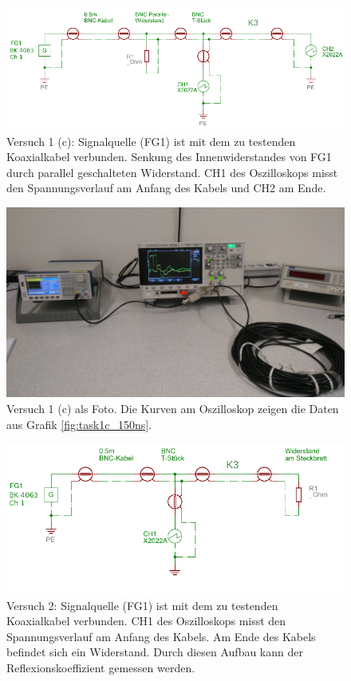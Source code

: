 \documentclass{article}
\begin{document}
\begin{figure}[H]
\centering
\caption{Versuch 1 (c): Signalquelle (FG1) ist mit dem zu testenden Koaxialkabel verbunden. Senkung des Innenwiderstandes von FG1 durch parallel geschalteten Widerstand. CH1 des Oszilloskops misst den Spannungsverlauf am Anfang des Kabels und CH2 am Ende.}
\label{fig:anordnung_task1c}
\includegraphics[scale=2]{task1c.png}
\end{figure}



\begin{figure}[H]
\centering
\caption{Versuch 1 (c) als Foto. Die Kurven am Oszilloskop zeigen die Daten aus Grafik \ref{fig:task1c_150ns}.}
\label{fig:foto_task1c}
\includegraphics[scale=0.6]{foto_task1c.jpg}
\end{figure}


\begin{figure}[H]
\centering
\caption{Versuch 2: Signalquelle (FG1) ist mit dem zu testenden Koaxialkabel verbunden. CH1 des Oszilloskops misst den Spannungsverlauf am Anfang des Kabels. Am Ende des Kabels befindet sich ein Widerstand. Durch diesen Aufbau kann der Reflexionskoeffizient gemessen werden.}
\label{fig:anordnung_task2}
\includegraphics[scale=2]{task2.png}
\end{figure}
\end{document}
